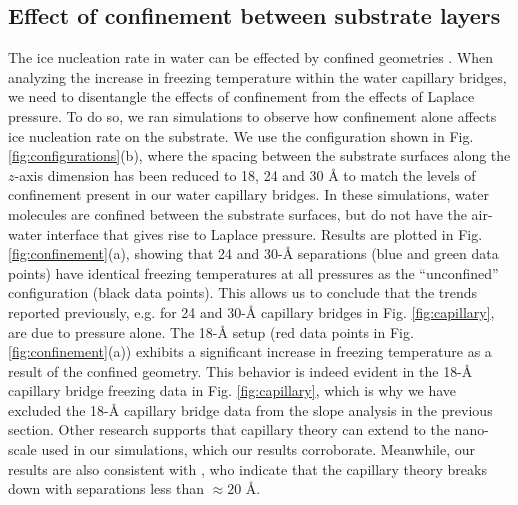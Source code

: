 \documentclass[journal abbreviation, manuscript]{copernicus}
\begin{document}
\subsection{Effect of confinement between substrate layers}
The ice nucleation rate in water can be effected by confined geometries \citep{cao2019, roudsari2022}. When analyzing the increase in freezing temperature within the water capillary bridges, we need to disentangle the effects of confinement from the effects of Laplace pressure. To do so, we ran simulations to observe how confinement alone affects ice nucleation rate on the substrate. We use the configuration shown in Fig. \ref{fig:configurations}(b), where the spacing between the substrate surfaces along the $z$-axis dimension has been reduced to 18, 24 and 30 \AA{} to match the levels of confinement present in our water capillary bridges. In these simulations, water molecules are confined between the substrate surfaces, but do not have the air-water interface that gives rise to Laplace pressure. Results are plotted in Fig. \ref{fig:confinement}(a), showing that 24 and 30-\AA{} separations (blue and green data points) have identical freezing temperatures at all pressures as the ``unconfined'' configuration (black data points). This allows us to conclude that the trends reported previously, e.g. for 24 and 30-\AA{} capillary bridges in Fig. \ref{fig:capillary}, are due to pressure alone. The 18-\AA{} setup (red data points in Fig. \ref{fig:confinement}(a)) exhibits a significant increase in freezing temperature as a result of the confined geometry. This behavior is indeed evident in the 18-\AA{} capillary bridge freezing data in Fig. \ref{fig:capillary}, which is why we have excluded the 18-\AA{} capillary bridge data from the slope analysis in the previous section. Other research \citep{elliott2021} supports that capillary theory can extend to the nano-scale used in our simulations, which our results corroborate. Meanwhile, our results are also consistent with \citet{Almeida2021}, who indicate that the capillary theory breaks down with separations less than $\approx 20$ \AA{}.
\end{document}

